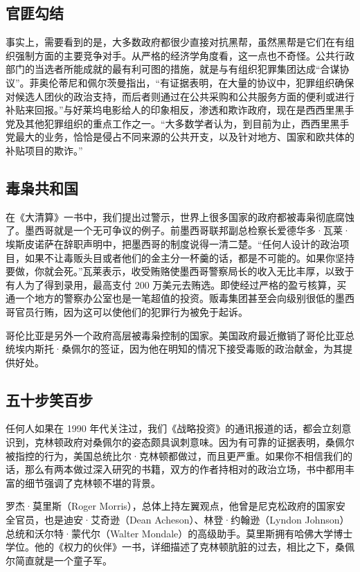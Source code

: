 \subsection{官匪勾结}
事实上，需要看到的是，大多数政府都很少直接对抗黑帮，虽然黑帮是它们在有组织强制方面的主要竞争对手。从严格的经济学角度看，这一点也不奇怪。公共行政部门的当选者所能成就的最有利可图的措施，就是与有组织犯罪集团达成“合谋协议”。菲奥伦蒂尼和佩尔茨曼指出，“有证据表明，在大量的协议中，犯罪组织确保对候选人团伙的政治支持，而后者则通过在公共采购和公共服务方面的便利或进行补贴来回报。”与好莱坞电影给人的印象相反，渗透和欺诈政府，现在是西西里黑手党及其他犯罪组织的重点工作之一。“大多数学者认为，到目前为止，西西里黑手党最大的业务，恰恰是侵占不同来源的公共开支，以及针对地方、国家和欧共体的补贴项目的欺诈。”

\subsection{毒枭共和国}
在《大清算》一书中，我们提出过警示，世界上很多国家的政府都被毒枭彻底腐蚀了。墨西哥就是一个无可争议的例子。前墨西哥联邦副总检察长爱德华多·瓦莱·埃斯皮诺萨在辞职声明中，把墨西哥的制度说得一清二楚。“任何人设计的政治项目，如果不让毒贩头目或者他们的金主分一杯羹的话，都是不可能的。如果你坚持要做，你就会死。”瓦莱表示，收受贿赂使墨西哥警察局长的收入无比丰厚，以致于有人为了得到录用，最高支付 200 万美元去贿选。即使经过严格的盈亏核算，买通一个地方的警察办公室也是一笔超值的投资。贩毒集团甚至会向级别很低的墨西哥官员行贿，因为这可以使他们的犯罪行为被免于起诉。

哥伦比亚是另外一个政府高层被毒枭控制的国家。美国政府最近撤销了哥伦比亚总统埃内斯托·桑佩尔的签证，因为他在明知的情况下接受毒贩的政治献金，为其提供好处。

\subsection{五十步笑百步}
任何人如果在 1990 年代关注过，我们《战略投资》的通讯报道的话，都会立刻意识到，克林顿政府对桑佩尔的姿态颇具讽刺意味。因为有可靠的证据表明，桑佩尔被指控的行为，美国总统比尔·克林顿都做过，而且更严重。如果你不相信我们的话，那么有两本做过深入研究的书籍，双方的作者持相对的政治立场，书中都用丰富的细节强调了克林顿不堪的背景。

罗杰·莫里斯（Roger Morris），总体上持左翼观点，他曾是尼克松政府的国家安全官员，也是迪安·艾奇逊（Dean Acheson）、林登·约翰逊（Lyndon Johnson）总统和沃尔特·蒙代尔（Walter Mondale）的高级助手。莫里斯拥有哈佛大学博士学位。他的《权力的伙伴》一书，详细描述了克林顿肮脏的过去，相比之下，桑佩尔简直就是一个童子军。

